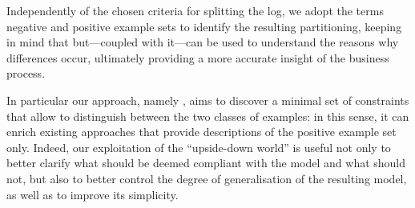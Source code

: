 %
Independently of the chosen criteria for splitting the log, we adopt the terms negative and positive example sets to identify the resulting partitioning, keeping in mind that but---coupled with it---can be used to understand the reasons why differences occur, ultimately providing a more accurate insight of the business process.


%
In particular our approach, namely \nd, aims to discover a minimal set of constraints that allow to distinguish between the two classes of examples: in this sense, it can enrich existing approaches that provide descriptions of the positive example set only. Indeed, our exploitation of the ``upside-down world'' is useful not only to better clarify what should be deemed compliant with the model and what should not, but also to better control the degree of generalisation of the resulting model, as well as to improve its simplicity.


